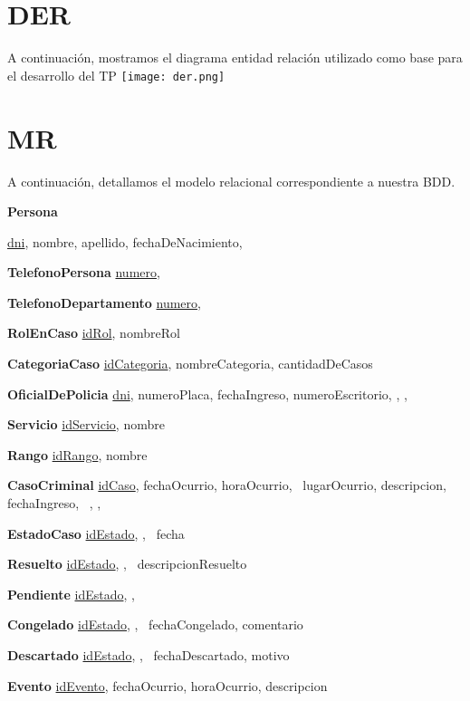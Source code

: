 \documentclass[11pt, a4paper]{article}
\begin{document}
\section{DER}
A continuación, mostramos el diagrama entidad relación utilizado como base para el desarrollo del TP
\texttt{[image: der.png]}

\section{MR}
A continuación, detallamos el modelo relacional correspondiente a nuestra BDD.


\textbf{Persona} {\underline{dni}, nombre, apellido, fechaDeNacimiento, \

\textbf{TelefonoPersona} {\underline{numero}, }

\textbf{TelefonoDepartamento} {\underline{numero}, }

\textbf{RolEnCaso} {\underline{idRol}, nombreRol}

\textbf{CategoriaCaso} {\underline{idCategoria}, nombreCategoria, cantidadDeCasos}

\textbf{OficialDePolicia} {\underline{dni}, numeroPlaca, fechaIngreso, 
	numeroEscritorio, \dashuline{idRango}, \dashuline{idServicio},
	}

\textbf{Servicio} {\underline{idServicio}, nombre}

\textbf{Rango} {\underline{idRango}, nombre}

\textbf{CasoCriminal} {\underline{idCaso}, fechaOcurrio, horaOcurrio, \ 
	lugarOcurrio, descripcion, fechaIngreso, \
	, , \
	}

\textbf{EstadoCaso} {\underline{idEstado}, , \
	fecha}

\textbf{Resuelto} {\underline{idEstado}, , \ 	
	descripcionResuelto}

\textbf{Pendiente} {\underline{idEstado}, ,}

\textbf{Congelado} {\underline{idEstado}, , \
	fechaCongelado, comentario}

\textbf{Descartado} {\underline{idEstado}, \dashuline{idCaso}, \
	fechaDescartado, motivo}

\textbf{Evento} {\underline{idEvento}, fechaOcurrio, horaOcurrio, descripcion} 

}
\end{document}
